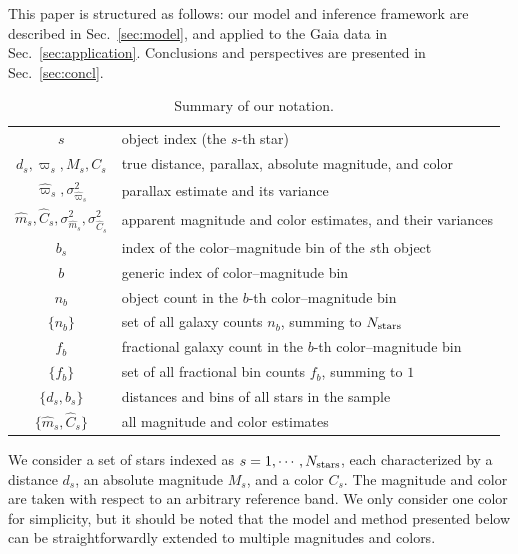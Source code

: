 \documentclass[manuscript, letterpaper]{aastex6}
\makeatletter
\let\origsection\section
\renewcommand\section{\@ifstar{\starsection}{\nostarsection}}
\newcommand\nostarsection[1]{\sectionprelude\origsection{#1}}
\newcommand\starsection[1]{\sectionprelude\origsection*{#1}}
\newcommand\sectionprelude{\vspace{1em}}
\newcommand{\secref}[1]{{\xspace}Sec.~\ref{#1}}
\newcommand{\nobj}{{N_{\rm stars}}}
\makeatother
\begin{document}
This paper is structured as follows: our model and inference framework are described in \secref{sec:model}, and applied to the Gaia data in \secref{sec:application}. 
Conclusions and perspectives are presented in \secref{sec:concl}.

\section{Model}\label{sec:model}


\begin{table} %
\centering
\begin{tabular}{cl}
\hline
$s$	&	object index (the $s$-th star)\\
$d_s, \varpi_s, M_s, C_s$	&	true distance, parallax, absolute magnitude, and color	\\
$\hat{\varpi}_s, \sigma_{\hat{\varpi}_s}^2$ 	&	parallax estimate and its variance\\
$\hat{m}_s, \hat{C}_s, \sigma^2_{\hat{m}_s}, \sigma^2_{\hat{C}_s}$ 	&	apparent magnitude and color estimates, and their variances\\
$b_s$	&	index of the color--magnitude bin of the $s$th object\\
\hline
$b$	&	generic index of color--magnitude bin\\
$n_b$	& 	object count in the $b$-th color--magnitude bin  \\
$\{n_b\}$	&	set of all galaxy counts $n_b$, summing to $\nobj$\\
$f_b$	&	fractional galaxy count in the $b$-th color--magnitude bin  \\
$\{f_b\}$	&	set of all fractional bin counts $f_b$, summing to $1$\\
$\{ d_s, b_s\}$	&	distances and bins of all stars in the sample	\\
$\{ \hat{m}_s, \hat{C}_s \}$ &	all magnitude and color estimates\\
\hline
\end{tabular}
\caption{Summary of our notation. }
\label{tab:notation}
\end{table} 

We consider a set of stars indexed as $s=1, \cdots, \nobj$, each characterized by a distance $d_s$, an absolute magnitude $M_s$, and a color $C_s$. 
The magnitude and color are taken with respect to an arbitrary reference band.
We only consider one color for simplicity, but it should be noted that the model and method presented below can be straightforwardly extended to multiple magnitudes and colors.
\end{document}
